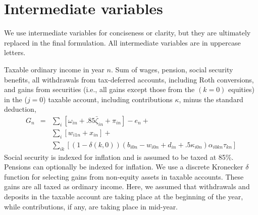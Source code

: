 \documentclass{report}[fleqn,12pt]
\begin{document}
\section{Intermediate variables}
We use intermediate variables for conciseness or clarity,
but they are ultimately replaced in the final formulation.
All intermediate variables are in uppercase letters.
\begin{description}[leftmargin=4em,style=multiline]
\item [$G_n$]
	Taxable ordinary income in year $n$. Sum of wages, pension, social security benefits, all withdrawals
	from tax-deferred accounts, including Roth conversions, and gains from securities
	(i.e., all gains except those from the $(k=0)$ equities)
	in the ($j=0$) taxable account, including contributions $\kappa$, minus the standard deduction,
	\begin{eqnarray}
		\label{Eq:Tx2}
		G_n &=& 
		\sum_{i} [\omega_{in} + .85\bar\zeta_{in} + \pi_{in}]
		- e_n +
		\nonumber \\
		&& \sum_{i} [w_{i1n} + x_{in}] +
		\nonumber \\
		&& \sum_{ik} 
		[(1-\delta(k, 0))(b_{i0n} - w_{i0n} + d_{in} + .5\kappa_{i0n})\alpha_{i0kn}\tau_{kn}]
	\end{eqnarray}
	Social security is indexed for inflation and is assumed to be taxed at 85\%.
	Pensions can optionally be indexed for inflation.
	We use a discrete Kronecker $\delta$ function for selecting gains from non-equity assets in
	taxable accounts. These gains are all taxed as ordinary income. Here, we assumed that
	withdrawals and deposits in the taxable account are taking place at the beginning of the year, while
	contributions, if any, are taking place in mid-year.


\end{description}
\end{document}
